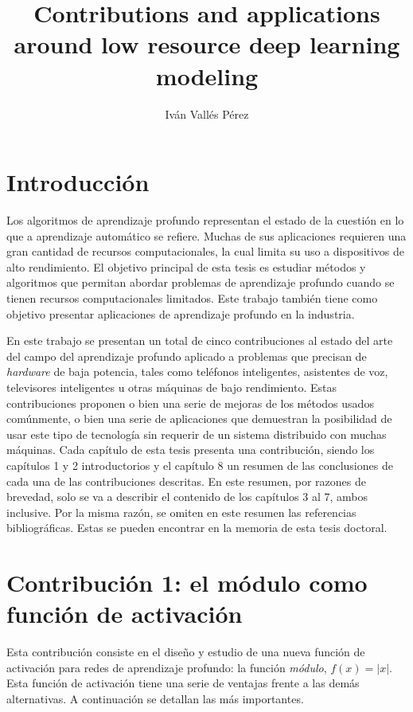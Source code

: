 \documentclass[10pt,a4paper,titlepage,table]{report}
\author{Iván Vallés Pérez}
\title{Contributions and applications around low resource deep learning modeling}
\begin{document}
	


\pagestyle{MyStyle}

\section*{Introducción}
Los algoritmos de aprendizaje profundo representan el estado de la cuestión en lo que a aprendizaje automático se refiere. Muchas de sus aplicaciones requieren una gran cantidad de recursos computacionales, la cual limita su uso a dispositivos de alto rendimiento. El objetivo principal de esta tesis es estudiar métodos y algoritmos que permitan abordar problemas de aprendizaje profundo cuando se tienen recursos computacionales limitados. Este trabajo también tiene como objetivo presentar aplicaciones de aprendizaje profundo en la industria.

En este trabajo se presentan un total de cinco contribuciones al estado del arte del campo del aprendizaje profundo aplicado a problemas que precisan de \textit{hardware} de baja potencia, tales como teléfonos inteligentes, asistentes de voz, televisores inteligentes u otras máquinas de bajo rendimiento. Estas contribuciones proponen o bien una serie de mejoras de los métodos usados comúnmente, o bien una serie de aplicaciones que demuestran la posibilidad de usar este tipo de tecnología sin requerir de un sistema distribuido con muchas máquinas. Cada capítulo de esta tesis presenta una contribución, siendo los capítulos 1 y 2 introductorios y el capítulo 8 un resumen de las conclusiones de cada una de las contribuciones descritas. En este resumen, por razones de brevedad, solo se va a describir el contenido de los capítulos 3 al 7, ambos inclusive.  Por la misma razón, se omiten en este resumen las referencias bibliográficas. Estas se pueden encontrar en la memoria de esta tesis doctoral.


\section*{Contribución 1: el módulo como función de activación}
Esta contribución consiste en el diseño y estudio de una nueva función de activación para redes de aprendizaje profundo: la función \textit{módulo}, $f(x) = |x|$. Esta función de activación tiene una serie de ventajas frente a las demás alternativas. A continuación se detallan las más importantes.
\end{document}
